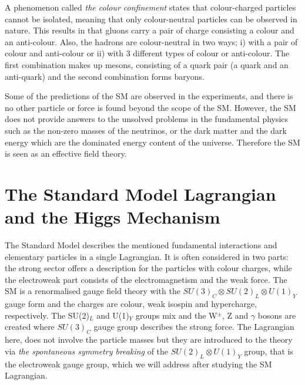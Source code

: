 A phenomenon called \emph{the colour confinement} states that colour-charged particles cannot be isolated, meaning that only colour-neutral particles can be observed in nature\footnotemark. This results in that gluons carry a pair of charge consisting a colour and an anti-colour. Also, the hadrons are colour-neutral in two ways; i) with a pair of colour and anti-colour or ii) with 3 different types of colour or anti-colour. The first combination makes up mesons, consisting of a quark pair (a quark and an anti-quark) and the second combination forms baryons.


Some of the predictions of the SM are observed in the experiments, and there is no other particle or force is found beyond the scope of the SM. However, the SM does not provide answers to the unsolved problems in the fundamental physics such as the non-zero masses of the neutrinos\cite{neutrino-mass}, or the dark matter and the dark energy\cite{PlanckCol} which are the dominated energy content of the universe. Therefore the SM is seen as an effective field theory.

\section{The Standard Model Lagrangian and the Higgs Mechanism}
\label{theSMandHiggs}

The Standard Model describes the mentioned fundamental interactions and elementary particles in a single Lagrangian. It is often considered in two parts: the strong sector offers a description for the particles with colour charges, while the electroweak part consists of the electromagnetism and the weak force. The SM is a renormalised gauge field theory with the $ SU(3)_C \otimes SU(2)_L \otimes U(1)_Y$ gauge form and the charges are colour, weak isospin and hypercharge, respectively. The SU(2)$_L$ and U(1)$_Y$ groups mix and the W$^{\pm}$, Z and $\gamma$ bosons are created where $SU(3)_C$ gauge group describes the strong force. The Lagrangian here, does not involve the particle masses but they are introduced to the theory via \emph{the spontaneous symmetry breaking} of the $SU(2)_L \otimes U(1)_Y$ group, that is the electroweak gauge group, which we will address after studying the SM Lagrangian.

